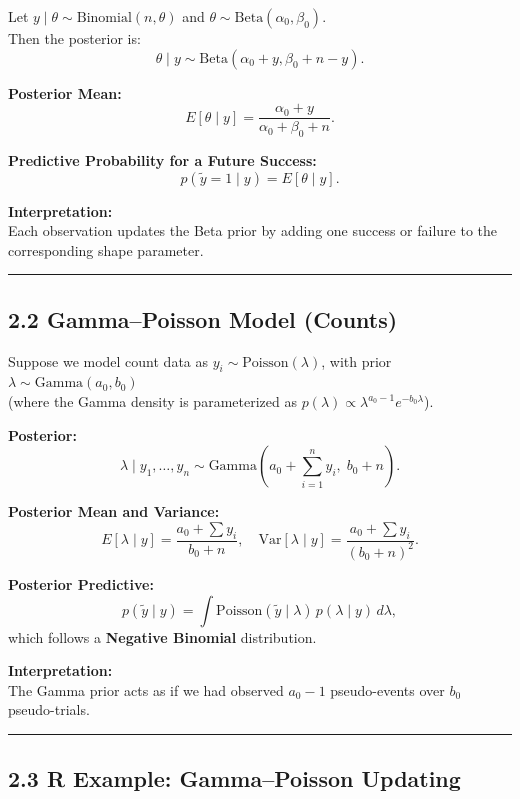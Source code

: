 \documentclass[
  letterpaper,
  DIV=11,
  numbers=noendperiod]{scrreprt}
\begin{document}
Let \(y \mid \theta \sim \text{Binomial}(n,\theta)\) and
\(\theta \sim \text{Beta}(\alpha_0,\beta_0)\).\\
Then the posterior is: \[
\theta \mid y \sim \text{Beta}(\alpha_0 + y, \beta_0 + n - y).
\]

\textbf{Posterior Mean:} \[
E[\theta \mid y] = \frac{\alpha_0 + y}{\alpha_0 + \beta_0 + n}.
\]

\textbf{Predictive Probability for a Future Success:} \[
p(\tilde{y}=1 \mid y) = E[\theta \mid y].
\]

\textbf{Interpretation:}\\
Each observation updates the Beta prior by adding one success or failure
to the corresponding shape parameter.

\begin{center}\rule{0.5\linewidth}{0.5pt}\end{center}

\subsection{2.2 Gamma--Poisson Model
(Counts)}\label{gammapoisson-model-counts}

Suppose we model count data as \(y_i \sim \text{Poisson}(\lambda)\),
with prior \(\lambda \sim \text{Gamma}(a_0, b_0)\)\\
(where the Gamma density is parameterized as
\(p(\lambda) \propto \lambda^{a_0-1} e^{-b_0\lambda}\)).

\textbf{Posterior:} \[
\lambda \mid y_1,\ldots,y_n \sim \text{Gamma}\left(a_0 + \sum_{i=1}^n y_i,\; b_0 + n\right).
\]

\textbf{Posterior Mean and Variance:} \[
E[\lambda \mid y] = \frac{a_0 + \sum y_i}{b_0 + n}, \quad
\text{Var}[\lambda \mid y] = \frac{a_0 + \sum y_i}{(b_0 + n)^2}.
\]

\textbf{Posterior Predictive:} \[
p(\tilde{y} \mid y) = \int \text{Poisson}(\tilde{y} \mid \lambda)\, p(\lambda \mid y)\, d\lambda,
\] which follows a \textbf{Negative Binomial} distribution.

\textbf{Interpretation:}\\
The Gamma prior acts as if we had observed \(a_0-1\) pseudo-events over
\(b_0\) pseudo-trials.

\begin{center}\rule{0.5\linewidth}{0.5pt}\end{center}

\subsection{2.3 R Example: Gamma--Poisson
Updating}\label{r-example-gammapoisson-updating}
\end{document}
